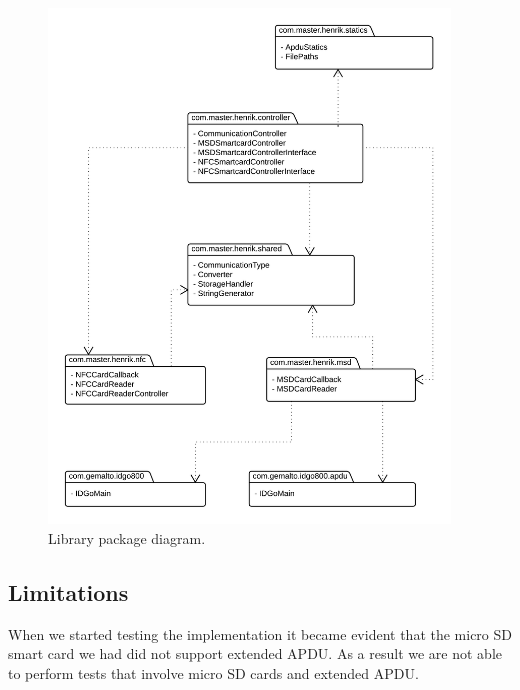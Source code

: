\begin{figure}[h!]
  \caption{Library package diagram.}
  \label{fig:package}
  \centering
    \includegraphics[width=0.95\textwidth]{images/package2.png}
\end{figure}

\fi %

\subsection{Limitations}
\label{sec:limitationsMSD}
When we started testing the implementation it became evident that the micro SD smart card we had did not support extended APDU. As a result we are not able to perform tests that involve micro SD cards and extended APDU.
